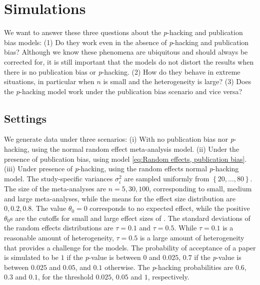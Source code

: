 \documentclass[useAMS,usenatbib,referee]{biom}
\begin{document}
\section{Simulations}\label{sect:simulations}

We want to answer these three questions about the \textit{p}-hacking and publication bias models: (1) Do they work even in the absence of \textit{p}-hacking and publication bias? Although we know these phenomena are ubiquitous and should always be corrected for, it is still important that the models do not distort the results when there is no publication bias or \textit{p}-hacking. (2) How do they behave in extreme situations, in particular when $n$ is small and the heterogeneity is large? (3) %
Does the \textit{p}-hacking model work under the publication bias scenario and vice versa?

\subsection{Settings}
We generate data under three scenarios: (i) With no publication bias nor \textit{p}-hacking, using the normal random effect meta-analysis model. (ii) Under the presence of publication bias, using model \eqref{eq:Random effects, publication bias}. (iii) Under presence of \textit{p}-hacking, using the random effects normal \textit{p}-hacking model. The study-specific variances $\sigma_{i}^{2}$ are sampled uniformly from $\left\{ 20,\ldots,80\right\} $. The size of the meta-analyses are $n = 5, 30, 100$, corresponding to small, medium and large meta-analyses, while the means for the effect size distribution are $0, 0.2, 0.8$. The value $\theta_0 = 0$ corresponds to no expected effect, while the positive $\theta_0$s are the cutoffs for small and large effect sizes of \citet[][pages 24 -- 27]{cohen1988statistical}. The standard deviations of the random effects distributions are $\tau=0.1$ and $\tau=0.5$. While $\tau = 0.1$ is a reasonable amount of heterogeneity, $\tau=0.5$ is a large amount of heterogeneity that provides a challenge for the models. The probability of acceptance of a paper is simulated to be $1$ if the \textit{p}-value is between $0$ and $0.025$, $0.7$ if the \textit{p}-value is between $0.025$ and $0.05$, and $0.1$ otherwise. The \textit{p}-hacking probabilities are $0.6$, $0.3$ and $0.1$, for the threshold $0.025$, $0.05$ and $1$, respectively. 
\end{document}
